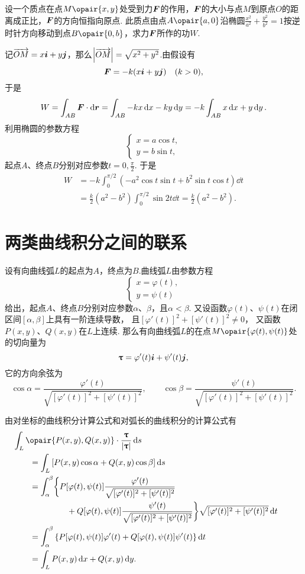 \begin{example}
设一个质点在点\(M\opair{x,y}\)处受到力\(\boldsymbol{F}\)的作用，\(\boldsymbol{F}\)的大小与点\(M\)到原点\(O\)的距离成正比，\(\boldsymbol{F}\)的方向恒指向原点.
此质点由点\(A\opair{a,0}\)沿椭圆\(\frac{x^2}{a^2}+\frac{y^2}{b^2}=1\)按逆时针方向移动到点\(B\opair{0,b}\)，求力\(\boldsymbol{F}\)所作的功\(W\).
\begin{solution}
记\(\overrightarrow{OM} = x\boldsymbol{i}+y\boldsymbol{j}\)，那么\(\abs{\overrightarrow{OM}} = \sqrt{x^2+y^2}\).由假设有\[
\boldsymbol{F} = -k(x\boldsymbol{i}+y\boldsymbol{j}) \quad (k>0),
\]于是\[
W = \int_{AB} \boldsymbol{F} \cdot \dd\boldsymbol{r}
= \int_{AB} -kx\dd{x}-ky\dd{y}
= -k \int_{AB} x\dd{x}+y\dd{y}.
\]利用椭圆的参数方程\[
\begin{cases}
x = a \cos t, \\
y = b \sin t,
\end{cases}
\]起点\(A\)、终点\(B\)分别对应参数\(t = 0,\frac{\pi}{2}\).
于是\begin{align*}
W &= -k \int_0^{\pi/2} (-a^2 \cos t \sin t + b^2 \sin t \cos t) \dd{t} \\
&= \frac{k}{2}(a^2-b^2) \int_0^{\pi/2} \sin 2t \dd{t}
= \frac{k}{2}(a^2-b^2).
\end{align*}
\end{solution}
\end{example}

\section{两类曲线积分之间的联系}
\begingroup
\def\lenTau{\sqrt{[\varphi'(t)]^2+[\psi'(t)]^2}}
\def\fTau#1{\frac{#1}{\lenTau}}
\def\funcParam{[\varphi(t),\psi(t)]}

设有向曲线弧\(L\)的起点为\(A\)，终点为\(B\).曲线弧\(L\)由参数方程\[
\begin{cases}
x = \varphi(t), \\
y = \psi(t)
\end{cases}
\]给出，起点\(A\)、终点\(B\)分别对应参数\(\alpha\)、\(\beta\)，且\(\alpha < \beta\).
又设函数\(\varphi(t)\)、\(\psi(t)\)在闭区间\([\alpha,\beta]\)上具有一阶连续导数，
且\([\varphi'(t)]^2+[\psi'(t)]^2 \neq 0\)，
又函数\(P(x,y)\)、\(Q(x,y)\)在\(L\)上连续.
那么有向曲线弧\(L\)的在点\(M\opair{\varphi(t),\psi(t)}\)处的切向量为\[
\boldsymbol{\uptau} = \varphi'(t) \boldsymbol{i} + \psi'(t) \boldsymbol{j},
\]它的方向余弦为\[
\cos\alpha=\fTau{\varphi'(t)},
\qquad
\cos\beta=\fTau{\psi'(t)}.
\]

由对坐标的曲线积分计算公式和对弧长的曲线积分的计算公式有
\begin{align*}
&\hspace{-20pt}\int_L{\opair{P(x,y),Q(x,y)}\cdot\frac{\mat{\tau}}{\abs{\mat{\tau}}}\dd{s}} \\
&=\int_L{[P(x,y)\cos\alpha+Q(x,y)\cos\beta]\dd{s}} \\
&=\int_{\alpha}^{\beta} \biggl\{ {P\funcParam\fTau{\varphi'(t)}} \\
	&\hspace{45pt}+{Q\funcParam\fTau{\psi'(t)}} \biggr\} \lenTau \dd{t} \\
&=\int_{\alpha}^{\beta} \left\{
		P\funcParam\varphi'(t) + Q\funcParam\psi'(t)
	\right\} \dd{t} \\
&=\int_L{P(x,y)\dd{x}+Q(x,y)\dd{y}}.
\end{align*}
\endgroup

